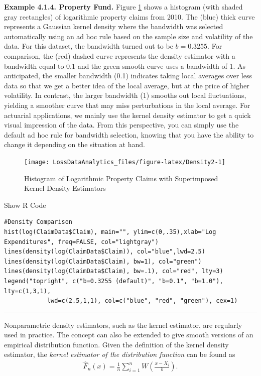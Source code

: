 \documentclass[]{book}
\theoremstyle{definition}
\theoremstyle{definition}
\theoremstyle{definition}
\theoremstyle{remark}
\begin{document}
\textbf{Example 4.1.4. Property Fund.} Figure \ref{fig:Density2} shows a
histogram (with shaded gray rectangles) of logarithmic property claims
from 2010. The (blue) thick curve represents a Gaussian kernel density
where the bandwidth was selected automatically using an ad hoc rule
based on the sample size and volatility of the data. For this dataset,
the bandwidth turned out to be \(b=0.3255\). For comparison, the (red)
dashed curve represents the density estimator with a bandwidth equal to
0.1 and the green smooth curve uses a bandwidth of 1. As anticipated,
the smaller bandwidth (0.1) indicates taking local averages over less
data so that we get a better idea of the local average, but at the price
of higher volatility. In contrast, the larger bandwidth (1) smooths out
local fluctuations, yielding a smoother curve that may miss
perturbations in the local average. For actuarial applications, we
mainly use the kernel density estimator to get a quick visual impression
of the data. From this perspective, you can simply use the default ad
hoc rule for bandwidth selection, knowing that you have the ability to
change it depending on the situation at hand.

\begin{figure}

{\centering \texttt{[image: LossDataAnalytics\_files/figure-latex/Density2-1]} 

}

\caption{Histogram of Logarithmic Property Claims with Superimposed Kernel Density Estimators}\label{fig:Density2}
\end{figure}

Show R Code

\hypertarget{togglekpdf}{}
\begin{verbatim}
#Density Comparison
hist(log(ClaimData$Claim), main="", ylim=c(0,.35),xlab="Log Expenditures", freq=FALSE, col="lightgray")
lines(density(log(ClaimData$Claim)), col="blue",lwd=2.5)
lines(density(log(ClaimData$Claim), bw=1), col="green")
lines(density(log(ClaimData$Claim), bw=.1), col="red", lty=3)
legend("topright", c("b=0.3255 (default)", "b=0.1", "b=1.0"), lty=c(1,3,1),
            lwd=c(2.5,1,1), col=c("blue", "red", "green"), cex=1)
\end{verbatim}

\begin{center}\rule{0.5\linewidth}{\linethickness}\end{center}

Nonparametric density estimators, such as the kernel estimator, are
regularly used in practice. The concept can also be extended to give
smooth versions of an empirical distribution function. Given the
definition of the kernel density estimator, the \emph{kernel estimator
of the distribution function} can be found as \[\begin{aligned}
\hat{F}_n(x) = \frac{1}{n} \sum_{i=1}^n W\left(\frac{x-X_i}{b}\right).\end{aligned}\]
\end{document}
